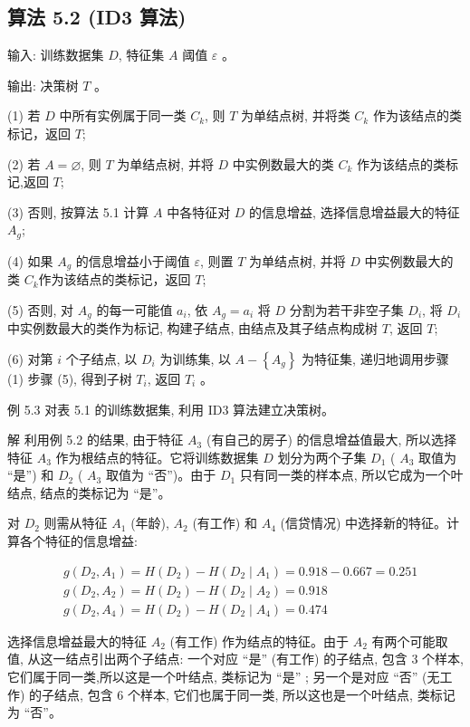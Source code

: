 \documentclass[10pt]{article}
\begin{document}
\begin{CJK*}{UTF8}{bsmi}
\section*{算法 5.2 (ID3 算法)}
输入: 训练数据集 $D$, 特征集 $A$ 阈值 $\varepsilon$ 。

输出: 决策树 $T$ 。

(1) 若 $D$ 中所有实例属于同一类 $C_{k}$, 则 $T$ 为单结点树, 并将类 $C_{k}$ 作为该结点的类标记，返回 $T$;

(2) 若 $A=\varnothing$, 则 $T$ 为单结点树, 并将 $D$ 中实例数最大的类 $C_{k}$ 作为该结点的类标记,返回 $T$;

(3) 否则, 按算法 5.1 计算 $A$ 中各特征对 $D$ 的信息增益, 选择信息增益最大的特征 $A_{g}$;

(4) 如果 $A_{g}$ 的信息增益小于阈值 $\varepsilon$, 则置 $T$ 为单结点树, 并将 $D$ 中实例数最大的类 $C_{k}$作为该结点的类标记，返回 $T$;

(5) 否则, 对 $A_{g}$ 的每一可能值 $a_{i}$, 依 $A_{g}=a_{i}$ 将 $D$ 分割为若干非空子集 $D_{i}$, 将 $D_{i}$ 中实例数最大的类作为标记, 构建子结点, 由结点及其子结点构成树 $T$, 返回 $T$;

(6) 对第 $i$ 个子结点, 以 $D_{i}$ 为训练集, 以 $A-\left\{A_{g}\right\}$ 为特征集, 递归地调用步骤 (1) 步骤 (5), 得到子树 $T_{i}$, 返回 $T_{i}$ 。

例 5.3 对表 5.1 的训练数据集, 利用 ID3 算法建立决策树。

解 利用例 5.2 的结果, 由于特征 $A_{3}$ (有自己的房子) 的信息增益值最大, 所以选择特征 $A_{3}$ 作为根结点的特征。它将训练数据集 $D$ 划分为两个子集 $D_{1}$ ( $A_{3}$ 取值为 “是”) 和 $D_{2}$ ( $A_{3}$ 取值为 “否”)。由于 $D_{1}$ 只有同一类的样本点, 所以它成为一个叶结点, 结点的类标记为 “是”。

对 $D_{2}$ 则需从特征 $A_{1}$ (年龄), $A_{2}$ (有工作) 和 $A_{4}$ (信贷情况) 中选择新的特征。计算各个特征的信息增益:

$$
\begin{aligned}
& g\left(D_{2}, A_{1}\right)=H\left(D_{2}\right)-H\left(D_{2} \mid A_{1}\right)=0.918-0.667=0.251 \\
& g\left(D_{2}, A_{2}\right)=H\left(D_{2}\right)-H\left(D_{2} \mid A_{2}\right)=0.918 \\
& g\left(D_{2}, A_{4}\right)=H\left(D_{2}\right)-H\left(D_{2} \mid A_{4}\right)=0.474
\end{aligned}
$$

选择信息增益最大的特征 $A_{2}$ (有工作) 作为结点的特征。由于 $A_{2}$ 有两个可能取值, 从这一结点引出两个子结点: 一个对应 “是” (有工作) 的子结点, 包含 3 个样本, 它们属于同一类,所以这是一个叶结点, 类标记为 “是” ; 另一个是对应 “否” (无工作) 的子结点, 包含 6 个样本, 它们也属于同一类, 所以这也是一个叶结点, 类标记为 “否”。


\end{CJK*}
\end{document}
